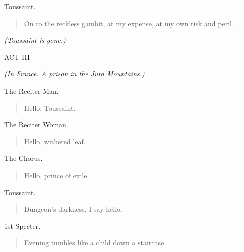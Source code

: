 \documentclass[letterpaper,article,12pt,oneside,notitlepage]{memoir}
\begin{document}
\begin{center}Toussaint.\end{center}

\begin{verse}
On to the reckless gambit, at my expense, at my own risk and peril ... \\
\end{verse}

\textit{(Toussaint is gone.)}

\clearpage

\begin{center}ACT III\end{center}
\vspace{1cm}

\textit{(In France. A prison in the Jura Mountains.)}

\begin{center}The Reciter Man.\end{center}

\begin{verse}
Hello, Toussaint. \\
\end{verse}

\begin{center}The Reciter Woman.\end{center}

\begin{verse}
Hello, withered leaf. \\
\end{verse}

\begin{center}The Chorus.\end{center}

\begin{verse}
Hello, prince of exile. \\
\end{verse}

\begin{center}Toussaint.\end{center}

\begin{verse}
Dungeon's darkness, I say hello. \\
\end{verse}

\begin{center}1st Specter.\end{center}

\begin{verse}
Evening tumbles like a child down a staircase. \\
\end{verse}
\end{document}

